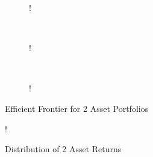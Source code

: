 \documentclass[11pt]{article}
\begin{document}
\begin{center}

\end{center}

\begin{figure}[!h]
   \centering 
   \begin{subfigure}[b]{0.30\textwidth}
     	\resizebox {\textwidth} {!} { }
		\label{fig:q1-b-efficient-frontier-1}
    \end{subfigure}
    ~
    \begin{subfigure}[b]{0.30\textwidth}
       	\resizebox {\textwidth} {!} { }
        \label{fig:q1-b-efficient-frontier-2}
    \end{subfigure}
	~
    \begin{subfigure}[b]{0.30\textwidth}
       	\resizebox {\textwidth} {!} { }
        \label{fig:q1-b-efficient-frontier-3}
    \end{subfigure}
    \caption{Efficient Frontier for 2 Asset Portfolios}\label{fig:naive_v_cvx}
\end{figure}

\begin{figure}[!h]
	\centering 
	\resizebox {\textwidth} {!} { }
	\caption{Distribution of 2 Asset Returns}
	\label{fig:q1-b-return-distribution}
\end{figure}

\end{document}
